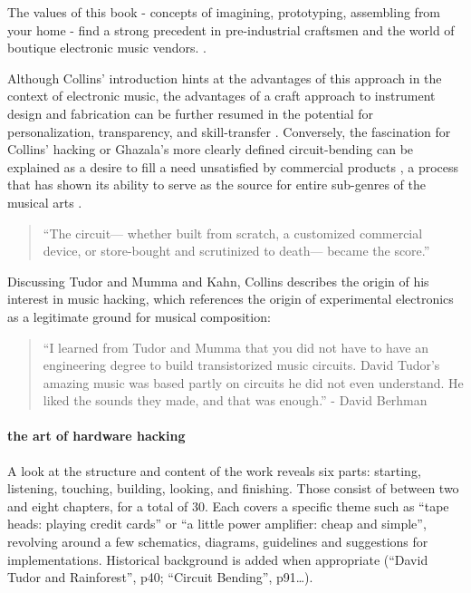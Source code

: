 \begin{itemize}
	The values of this book - concepts of imagining, prototyping, assembling from your home - find a strong precedent in pre-industrial craftsmen and the world of boutique electronic music vendors.   \citep{collins2006,ghazala2005,kuivila2004}. 

Although Collins’ introduction hints at the advantages of this approach in the context of electronic music, the advantages of a craft approach to instrument design and fabrication can be further resumed in the potential for personalization, transparency, and skill-transfer \citep{perner2011}. Conversely, the fascination for Collins’ hacking or Ghazala’s more clearly defined circuit-bending can be explained as a desire to fill a need unsatisfied by commercial products \citep{dunne2005}, a process that has shown its ability to serve as the source for entire sub-genres of the musical arts \citep{dunne2005,kelly2009,novak2013}. 
\begin{quote}
“The circuit— whether built from scratch, a customized commercial device, or store-bought and scrutinized to death— became the score.”
\citep{collins2004}
\end{quote}

	Discussing Tudor and Mumma and Kahn, Collins describes the origin of his interest in music hacking, which references the origin of experimental electronics as a legitimate ground for musical composition: 

\begin{quote}
“I learned from Tudor and Mumma that you did not have to have an engineering degree to build transistorized music circuits. David Tudor’s amazing music was based partly on circuits he did not even understand. He liked the sounds they made, and that was enough.” 
- David Berhman \cite[p.ix]{collins2006}  
\end{quote}

\paragraph{the art of hardware hacking}

A look at the structure and content of the work reveals six parts: starting, listening, touching, building, looking, and finishing. Those consist of between two and eight chapters, for a total of 30. Each covers a specific theme such as ``tape heads: playing credit cards'' or ``a little power amplifier: cheap and simple'', revolving around a few schematics, diagrams, guidelines and suggestions for implementations. Historical background is added when appropriate (``David Tudor and Rainforest'', p40; ``Circuit Bending'', p91…). 


\end{itemize}

